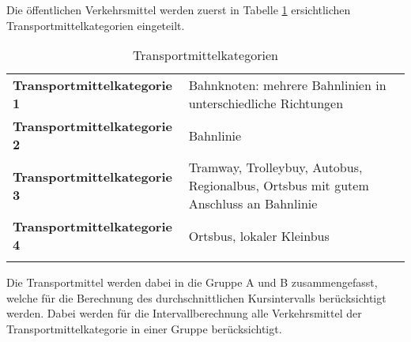 Die öffentlichen Verkehrsmittel werden zuerst in Tabelle \ref{table:Transportmittelkategorien} ersichtlichen Transportmittelkategorien eingeteilt.

\begin{longtable}{l p{10.6cm}}
        \midrule
        \textbf{Transportmittelkategorie 1}
                                    & Bahnknoten: mehrere Bahnlinien in unterschiedliche Richtungen\\
        \textbf{Transportmittelkategorie 2}
                                    & Bahnlinie\\
        \textbf{Transportmittelkategorie 3}
                                    & Tramway, Trolleybuy, Autobus, Regionalbus, Ortsbus mit gutem Anschluss an Bahnlinie\\
        \textbf{Transportmittelkategorie 4}
                                    & Ortsbus, lokaler Kleinbus\\
        \bottomrule
    \caption{Transportmittelkategorien}
    \label{table:Transportmittelkategorien}
\end{longtable}

Die Transportmittel werden dabei in die Gruppe A und B zusammengefasst, welche für die Berechnung des durchschnittlichen Kursintervalls berücksichtigt werden.
Dabei werden für die Intervallberechnung alle Verkehrsmittel der Transportmittelkategorie in einer Gruppe berücksichtigt.

